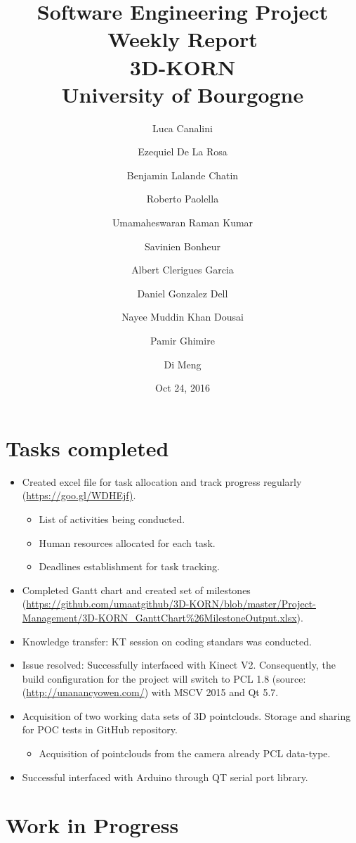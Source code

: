 \documentclass[11pt]{article} %
\title{Software Engineering Project Weekly Report\\ \textbf{3D-KORN} \\ University of Bourgogne}
\author{Luca Canalini \and Ezequiel De La Rosa \and Benjamin Lalande Chatin \and Roberto Paolella \and Umamaheswaran Raman Kumar \and Savinien Bonheur \and Albert Clerigues Garcia \and Daniel Gonzalez Dell \and Nayee Muddin Khan Dousai \and Pamir Ghimire \and Di Meng
}
\date{Oct 24, 2016} %
\begin{document}
\maketitle
\newpage

\section{Tasks completed}
\begin{itemize}
\item Created excel file for task allocation and track progress regularly (\url{https://goo.gl/WDHEjf)}. %
\begin{itemize}
		\item List of activities being conducted. 
		\item Human resources allocated for each task.
		\item Deadlines establishment for task tracking.	\end{itemize}

\item Completed Gantt chart and created set of milestones (\url {https://github.com/umaatgithub/3D-KORN/blob/master/Project-Management/3D-KORN_GanttChart\%26MilestoneOutput.xlsx}).

	
\item Knowledge transfer: KT session on coding standars was conducted.

\item Issue resolved:  Successfully interfaced with Kinect V2. Consequently, the build configuration for the project will switch to PCL 1.8 (source: (\url{http://unanancyowen.com/}) with MSCV 2015 and Qt 5.7.  
			
\item Acquisition of two working data sets of 3D pointclouds. Storage and sharing for POC tests in GitHub repository.
	\begin{itemize}
		\item Acquisition of pointclouds from the camera already PCL data-type.
	\end{itemize}   

\item Successful interfaced with Arduino through QT serial port library.


\end{itemize}

\section{Work in Progress}
\end{document}
